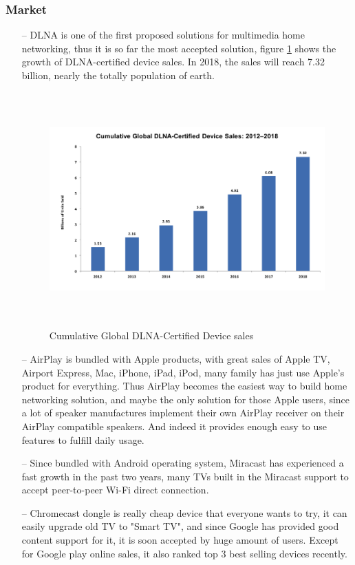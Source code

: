 \subsubsection{Market}
\begin{itemize}
\item[--]DLNA is one of the first proposed solutions for multimedia home
networking, thus it is so far the most accepted solution, figure
\ref{dlna_market} shows the growth of DLNA-certified device sales. In 2018, the
sales will reach 7.32 billion, nearly the totally population of earth.

\begin{figure}[htb]
\centering \includegraphics[height=9cm]{charts/dlna_market}
\caption{Cumulative Global DLNA-Certified Device sales \label{dlna_market}}
\end{figure}

\item[--]AirPlay is bundled with Apple products, with great sales of Apple TV, Airport Express, 
Mac, iPhone, iPad, iPod, many family has just use Apple's product for
everything. Thus AirPlay becomes the easiest way to build home networking solution, and maybe the only solution for those 
Apple users, since a lot of speaker manufactures implement their own AirPlay
receiver on their AirPlay compatible speakers. And indeed it provides enough easy to use features to fulfill daily usage.
\item[--]Since bundled with Android operating system, Miracast has experienced a fast growth in 
the past two years, many TVs built in the Miracast support to accept peer-to-peer Wi-Fi direct connection.
\item[--]Chromecast dongle is really cheap device that everyone wants to try, it can easily upgrade 
old TV to "Smart TV", and since Google has provided good content support for it, it is soon accepted 
by huge amount of users. Except for Google play online sales, it also ranked top 3 best selling devices 
recently.
\end{itemize}

